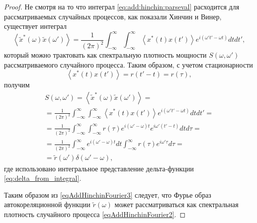 \begin{theorem}
\begin{proof}
Не смотря на то что интеграл \eqref{eq:add:hinchin:parseval}
расходится для
рассматриваемых случайных процессов, как показали Хинчин и Винер,
существует интеграл
\begin{equation}
\left<\tilde{x}^{*}\left(\omega\right)\tilde{x}\left(\omega'\right)\right>
= 
\frac{1}{\left(2 \pi\right)^2}
\int_{-\infty}^{\infty}\int_{-\infty}^{\infty}\left<x^{*}\left(t\right)x\left(t'\right)\right>e^{i
  \left(\omega' t' - \omega t\right)}dtdt',
\label{eqAddHinchinFourier2}
\end{equation}
который можно трактовать как спектральную плотность мощности $S\left(\omega,\omega'\right)$
рассматриваемого случайного процесса. Таким образом, с учетом стационарности
\[
\left<x^{*}\left(t\right)x\left(t'\right)\right> = r\left(t' - t\right) = r\left(\tau\right),
\]
получим
\begin{eqnarray}
S\left(\omega, \omega'\right) =
\left<\tilde{x}^{*}\left(\omega\right)\tilde{x}\left(\omega'\right)\right>
= 
\nonumber \\
=
\frac{1}{\left(2 \pi\right)^2}
\int_{-\infty}^{\infty}\int_{-\infty}^{\infty}\left<x^{*}\left(t\right)x\left(t'\right)\right>e^{i
  \left(\omega' t' - \omega t\right)}dtdt' =
\nonumber \\
=
\frac{1}{\left(2 \pi\right)^2}
\int_{-\infty}^{\infty}\int_{-\infty}^{\infty}
r\left(\tau\right)
e^{i\left(\omega' - \omega\right) t}
e^{i\omega'\left(t' - t\right) }
dtd\tau =
\nonumber \\
=
\frac{1}{\left(2 \pi\right)^2}
\int_{-\infty}^{\infty}
e^{i \left(\omega' - \omega\right) t}dt 
\int_{-\infty}^{\infty}r\left(\tau\right)
e^{i \omega' \tau}d\tau =
\nonumber \\
= \tilde{r}\left(\omega'\right)\delta\left(\omega' - \omega\right),
\label{eqAddHinchinFourier3}
\end{eqnarray}
где использовано интегральное представление дельта-функции \eqref{eq:delta_from_integral}.

Таким образом из \eqref{eqAddHinchinFourier3} следует, что Фурье образ
автокореляционной функции $\tilde{r}\left(\omega\right)$ может
рассматриваться как спектральная плотность случайного процесса
\eqref{eqAddHinchinFourier2}. 
\end{proof}
\end{theorem}
